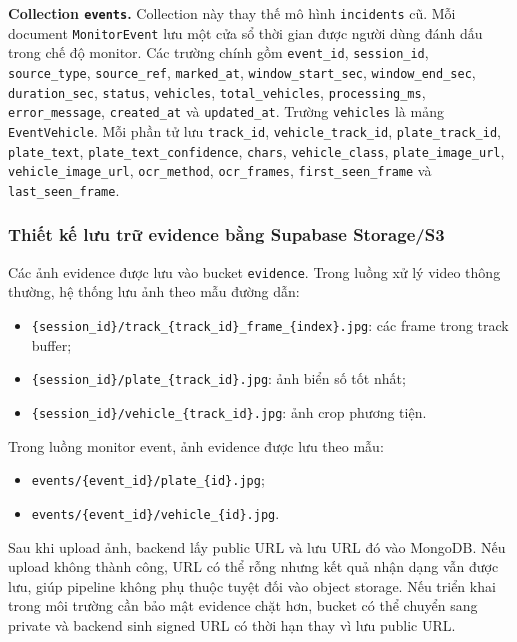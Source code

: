 \documentclass[../DoAn.tex]{subfiles}
\begin{document}
\textbf{Collection \texttt{events}.} Collection này thay thế mô hình \texttt{incidents} cũ. Mỗi document \texttt{MonitorEvent} lưu một cửa sổ thời gian được người dùng đánh dấu trong chế độ monitor. Các trường chính gồm \texttt{event\_id}, \texttt{session\_id}, \texttt{source\_type}, \texttt{source\_ref}, \texttt{marked\_at}, \texttt{window\_start\_sec}, \texttt{window\_end\_sec}, \texttt{duration\_sec}, \texttt{status}, \texttt{vehicles}, \texttt{total\_vehicles}, \texttt{processing\_ms}, \texttt{error\_message}, \texttt{created\_at} và \texttt{updated\_at}. Trường \texttt{vehicles} là mảng \texttt{EventVehicle}. Mỗi phần tử lưu \texttt{track\_id}, \texttt{vehicle\_track\_id}, \texttt{plate\_track\_id}, \texttt{plate\_text}, \texttt{plate\_text\_confidence}, \texttt{chars}, \texttt{vehicle\_class}, \texttt{plate\_image\_url}, \texttt{vehicle\_image\_url}, \texttt{ocr\_method}, \texttt{ocr\_frames}, \texttt{first\_seen\_frame} và \texttt{last\_seen\_frame}.

\subsubsection{Thiết kế lưu trữ evidence bằng Supabase Storage/S3}

Các ảnh evidence được lưu vào bucket \texttt{evidence}. Trong luồng xử lý video thông thường, hệ thống lưu ảnh theo mẫu đường dẫn:

\begin{itemize}
    \item \texttt{\{session\_id\}/track\_\{track\_id\}\_frame\_\{index\}.jpg}: các frame trong track buffer;
    \item \texttt{\{session\_id\}/plate\_\{track\_id\}.jpg}: ảnh biển số tốt nhất;
    \item \texttt{\{session\_id\}/vehicle\_\{track\_id\}.jpg}: ảnh crop phương tiện.
\end{itemize}

Trong luồng monitor event, ảnh evidence được lưu theo mẫu:

\begin{itemize}
    \item \texttt{events/\{event\_id\}/plate\_\{id\}.jpg};
    \item \texttt{events/\{event\_id\}/vehicle\_\{id\}.jpg}.
\end{itemize}

Sau khi upload ảnh, backend lấy public URL và lưu URL đó vào MongoDB. Nếu upload không thành công, URL có thể rỗng nhưng kết quả nhận dạng vẫn được lưu, giúp pipeline không phụ thuộc tuyệt đối vào object storage. Nếu triển khai trong môi trường cần bảo mật evidence chặt hơn, bucket có thể chuyển sang private và backend sinh signed URL có thời hạn thay vì lưu public URL.
\end{document}
